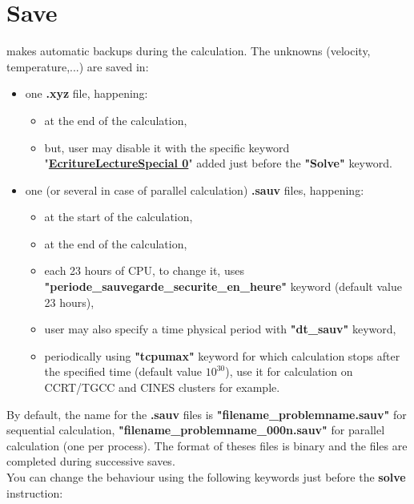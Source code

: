 \section{Save}
\trust makes automatic backups during the calculation. The unknowns (velocity, temperature,...) are saved in:
\begin{itemize}
\item one \textbf{.xyz} file, happening:
    \begin{itemize}
    \item at the end of the calculation,
    \item but, user may disable it with the specific keyword "\href{\REFERENCEMANUAL\#ecriturelecturespecial}{\textbf{EcritureLectureSpecial 0}}" added just before the \textbf{"Solve"} keyword.
    \end{itemize}


\item one (or several in case of parallel calculation) \textbf{.sauv} files, happening:
    \begin{itemize}
    \item at the start of the calculation,
    \item at the end of the calculation,
    \item each 23 hours of CPU, to change it, uses \small \textbf{"periode\_sauvegarde\_securite\_en\_heure"} \normalsize keyword (default value 23 hours),
    \item user may also specify a time physical period with \textbf{"dt\_sauv"} keyword,
    \item periodically using \textbf{"tcpumax"} keyword for which calculation stops after the specified time (default value $10^{30}$), use it for calculation on CCRT/TGCC and CINES clusters for example.
    \end{itemize}
\end{itemize}


By default, the name for the \textbf{.sauv} files is \textbf{"filename\_problemname.sauv"} for sequential calculation, \textbf{"filename\_problemname\_000n.sauv"} for parallel calculation (one per process).
The format of theses files is binary and the files are completed during successive saves.\\

You can change the behaviour using the following keywords just before the \textbf{solve} instruction:
\begin{center}
\end{center}

